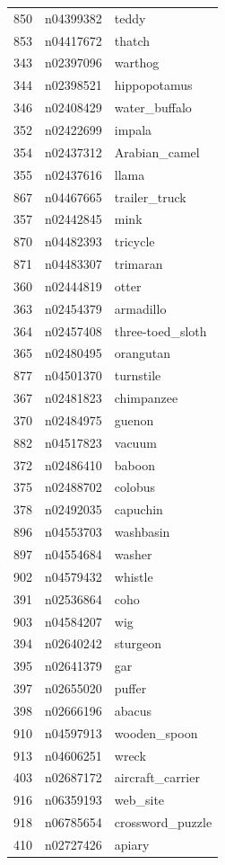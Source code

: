 \begin{table}
\begin{tabular}{cll}
850 & n04399382 & teddy \\
853 & n04417672 & thatch \\
343 & n02397096 & warthog \\
344 & n02398521 & hippopotamus \\
346 & n02408429 & water_buffalo \\
352 & n02422699 & impala \\
354 & n02437312 & Arabian_camel \\
355 & n02437616 & llama \\
867 & n04467665 & trailer_truck \\
357 & n02442845 & mink \\
870 & n04482393 & tricycle \\
871 & n04483307 & trimaran \\
360 & n02444819 & otter \\
363 & n02454379 & armadillo \\
364 & n02457408 & three-toed_sloth \\
365 & n02480495 & orangutan \\
877 & n04501370 & turnstile \\
367 & n02481823 & chimpanzee \\
370 & n02484975 & guenon \\
882 & n04517823 & vacuum \\
372 & n02486410 & baboon \\
375 & n02488702 & colobus \\
378 & n02492035 & capuchin \\
896 & n04553703 & washbasin \\
897 & n04554684 & washer \\
902 & n04579432 & whistle \\
391 & n02536864 & coho \\
903 & n04584207 & wig \\
394 & n02640242 & sturgeon \\
395 & n02641379 & gar \\
397 & n02655020 & puffer \\
398 & n02666196 & abacus \\
910 & n04597913 & wooden_spoon \\
913 & n04606251 & wreck \\
403 & n02687172 & aircraft_carrier \\
916 & n06359193 & web_site \\
918 & n06785654 & crossword_puzzle \\
410 & n02727426 & apiary \\

\end{tabular}
\end{table}
